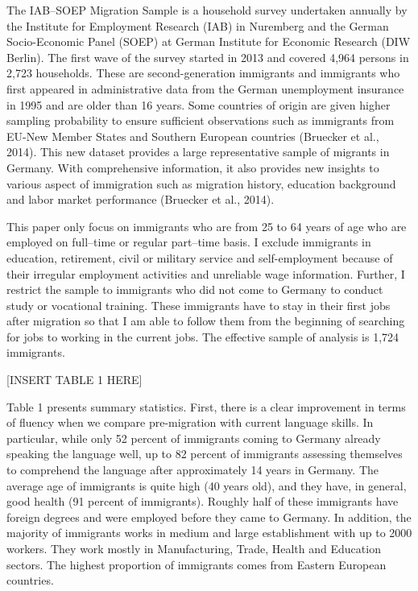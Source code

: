 \documentclass[12pt,a4paper]{article}
\begin{document}
The IAB--SOEP Migration Sample is a household survey undertaken annually by the Institute for Employment Research (IAB) in Nuremberg and the German Socio-Economic Panel (SOEP) at German Institute for Economic Research (DIW Berlin). The first wave of the survey started in 2013 and covered 4,964 persons in 2,723 households. These are second-generation immigrants and immigrants who first appeared in administrative data from the German unemployment insurance in 1995 and are older than 16 years. Some countries of origin are given higher sampling probability to ensure sufficient observations such as immigrants from EU-New Member States and Southern European countries (Bruecker et al., 2014). This new dataset provides a large representative sample of migrants in Germany. With comprehensive information, it also provides new insights to various aspect of immigration such as migration history, education background and labor market performance (Bruecker et al., 2014).

This paper only focus on immigrants who are from 25 to 64 years of age who are employed on full--time or regular part--time basis. I exclude immigrants in education, retirement, civil or military service and self-employment because of their irregular employment activities and unreliable wage information. Further, I restrict the sample to immigrants who did not come to Germany to conduct study or vocational training. These immigrants have to stay in their first jobs after migration so that I am able to follow them from the beginning of searching for jobs to working in the current jobs. The effective sample of analysis is 1,724 immigrants.

\begin{center}
[INSERT TABLE 1 HERE]
\end{center}

Table 1 presents summary statistics. First, there is a clear improvement in terms of fluency when we compare pre-migration with current language skills. In particular, while only 52 percent of immigrants coming to Germany already speaking the language well, up to 82 percent of immigrants assessing themselves to comprehend the language after approximately 14 years in Germany. The average age of immigrants is quite high (40 years old), and they have, in general, good health (91 percent of immigrants). Roughly half of these immigrants have foreign degrees and were employed before they came to Germany. In addition, the majority of immigrants works in medium and large establishment with up to 2000 workers. They work mostly in Manufacturing, Trade, Health and Education sectors. The highest proportion of immigrants comes from Eastern European countries.
\end{document}
